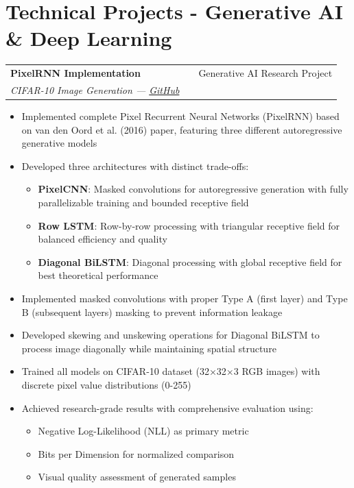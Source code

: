 \documentclass[a4paper,12pt]{article}
\makeatletter
\newenvironment{projectdetailed}[3]
    {
    \begin{tabularx}{\linewidth}{@{}l X r@{}}
    \textbf{#1} & \hfill & #2 \\
    \textit{#3} & & \\[3.75pt]
    \end{tabularx}
    \begin{minipage}[t]{\linewidth}
    \begin{itemize}[nosep,after=\strut, leftmargin=1em, itemsep=2pt,label=--]
    }
    {
    \end{itemize}
    \end{minipage}
    \vspace{6pt}
    }
\makeatother
\begin{document}
\section{Technical Projects - Generative AI \& Deep Learning}

\begin{projectdetailed}{PixelRNN Implementation}{Generative AI Research Project}{CIFAR-10 Image Generation — \href{https://github.com/Umer-Farooq-CS/PixelRNN-Implementation-CIFAR10}{GitHub}}
\item Implemented complete Pixel Recurrent Neural Networks (PixelRNN) based on van den Oord et al. (2016) paper, featuring three different autoregressive generative models
\item Developed three architectures with distinct trade-offs:
\begin{itemize}[nosep, leftmargin=2em]
    \item \textbf{PixelCNN}: Masked convolutions for autoregressive generation with fully parallelizable training and bounded receptive field
    \item \textbf{Row LSTM}: Row-by-row processing with triangular receptive field for balanced efficiency and quality
    \item \textbf{Diagonal BiLSTM}: Diagonal processing with global receptive field for best theoretical performance
\end{itemize}
\item Implemented masked convolutions with proper Type A (first layer) and Type B (subsequent layers) masking to prevent information leakage
\item Developed skewing and unskewing operations for Diagonal BiLSTM to process image diagonally while maintaining spatial structure
\item Trained all models on CIFAR-10 dataset (32×32×3 RGB images) with discrete pixel value distributions (0-255)
\item Achieved research-grade results with comprehensive evaluation using:
\begin{itemize}[nosep, leftmargin=2em]
    \item Negative Log-Likelihood (NLL) as primary metric
    \item Bits per Dimension for normalized comparison
    \item Visual quality assessment of generated samples

\end{itemize}
\end{projectdetailed}
\end{document}
